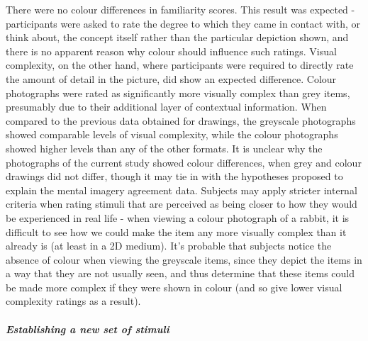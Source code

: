 \documentclass[
  11pt,
]{article}
\begin{document}
There were no colour differences in familiarity scores. This result was
expected - participants were asked to rate the degree to which they came
in contact with, or think about, the concept itself rather than the
particular depiction shown, and there is no apparent reason why colour
should influence such ratings. Visual complexity, on the other hand,
where participants were required to directly rate the amount of detail
in the picture, did show an expected difference. Colour photographs were
rated as significantly more visually complex than grey items, presumably
due to their additional layer of contextual information. When compared
to the previous data obtained for drawings, the greyscale photographs
showed comparable levels of visual complexity, while the colour
photographs showed higher levels than any of the other formats. It is
unclear why the photographs of the current study showed colour
differences, when grey and colour drawings did not differ, though it may
tie in with the hypotheses proposed to explain the mental imagery
agreement data. Subjects may apply stricter internal criteria when
rating stimuli that are perceived as being closer to how they would be
experienced in real life - when viewing a colour photograph of a rabbit,
it is difficult to see how we could make the item any more visually
complex than it already is (at least in a 2D medium). It's probable that
subjects notice the absence of colour when viewing the greyscale items,
since they depict the items in a way that they are not usually seen, and
thus determine that these items could be made more complex if they were
shown in colour (and so give lower visual complexity ratings as a
result).

\hypertarget{establishing-a-new-set-of-stimuli}{%
\paragraph{\texorpdfstring{\emph{Establishing a new set of
stimuli}}{Establishing a new set of stimuli}}\label{establishing-a-new-set-of-stimuli}}
\end{document}
